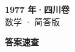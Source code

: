 \documentclass[zihao=-4, a4paper]{ctexart}
\begin{document}
\begin{center}
  {\Large\bfseries 1977 年·四川卷}\\[4pt]
  {\large 数学 · 简答版}
\end{center}
\medskip
{}

\clearpage
{}
\begin{center}{\Large\bfseries 答案速查}\end{center}
\medskip

\end{document}
